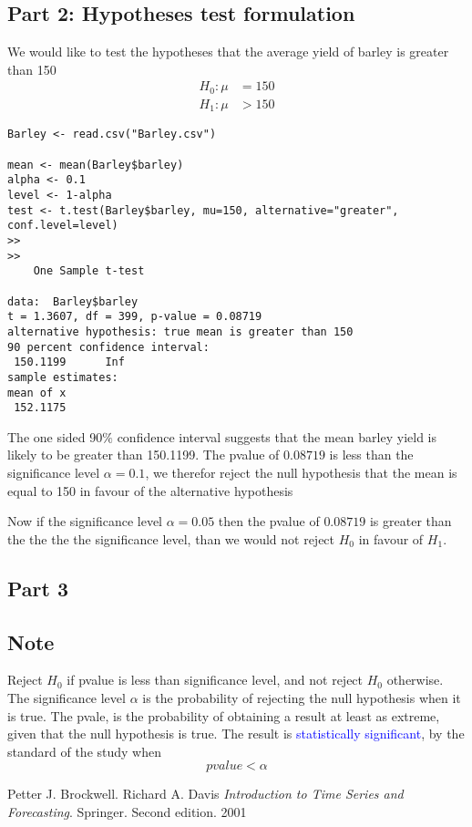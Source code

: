 \documentclass[11pt, oneside]{article}   	%
\begin{document}
\subsection{Part 2: Hypotheses test formulation}
We would like to test the hypotheses that the average yield of barley is greater than 150
\begin{equation}
\begin{split}
H_{0}: \mu & =150 \\
H_{1}:\mu &> 150
\end{split}
\end{equation}
\clearpage
\begin{lstlisting}[mathescape=false]
Barley <- read.csv("Barley.csv")

mean <- mean(Barley$barley)
alpha <- 0.1 
level <- 1-alpha
test <- t.test(Barley$barley, mu=150, alternative="greater", conf.level=level)
>>
>>
	One Sample t-test

data:  Barley$barley
t = 1.3607, df = 399, p-value = 0.08719
alternative hypothesis: true mean is greater than 150
90 percent confidence interval:
 150.1199      Inf
sample estimates:
mean of x 
 152.1175 
\end{lstlisting}
The one sided 90$\%$ confidence interval suggests that the mean barley yield is likely to be greater than 150.1199.
The pvalue of $0.08719$ is less than the significance level $\alpha = 0.1$, we therefor reject the null hypothesis that the mean is equal to 150 in favour of the alternative hypothesis

Now if the significance level $\alpha=0.05$  then the pvalue of $0.08719$ is greater than  the the the the significance level, than we would not reject $H_{0}$ in favour of $H_{1}$.
\subsection{Part 3}


\subsection{Note}
Reject $H_{0}$ if pvalue is less than significance level, and not reject $H_{0}$ otherwise. The significance level $\alpha$ is the probability of rejecting the null hypothesis when it is true.
The pvale, is the probability of obtaining a result at least as extreme, given that the null hypothesis is true. The result is \textcolor{blue}{statistically significant}, by the standard of the study when 
\begin{equation}
pvalue < \alpha
\end{equation}



\begin{thebibliography}{9}
Petter J. Brockwell. Richard A. Davis
\textit{Introduction to Time Series and Forecasting}. 
Springer. Second edition. 2001
 
\end{thebibliography}
\end{document}
